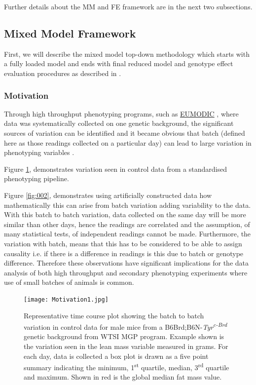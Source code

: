 \documentclass[12pt,a4paper]{article}
\begin{document}
Further details about the MM and FE framework are in the next two subsections.

\subsection{Mixed Model Framework}
First, we will describe the mixed model top-down methodology which starts with a fully loaded model and ends with final reduced model and genotype effect evaluation procedures as described in \cite{MM07}. 

\subsubsection{Motivation}
Through high throughput phenotyping programs, such as \href{http://www.eumodic.org/}{EUMODIC} , where data was systematically collected on one genetic background, the significant sources of variation can be identified and it became obvious that batch (defined here as those readings collected on a particular day) can lead to large variation in phenotyping variables \cite{MM12}.  

Figure \ref{fig:001}, demonstrates variation seen in control data from a standardised phenotyping pipeline. 

Figure \ref{fig:002}, demonstrates using artificially constructed data how mathematically this can arise from batch variation adding variability to the data. With this batch to batch variation, data collected on the same day will be more similar than other days, hence the readings are correlated and the assumption, of many statistical tests, of independent readings cannot be made.  Furthermore, the variation with batch, means that this has to be considered to be able to assign causality i.e. if there is a difference in readings is this due to batch or genotype difference.  Therefore these observations have significant implications for the data analysis of both high throughput and secondary phenotyping experiments where use of small batches of animals is common. 

\begin{figure}[!htpb]%
\centerline{\texttt{[image: Motivation1.jpg]}}
\caption{Representative time course plot showing the batch to batch variation in control data for male mice from a B6Brd;B6N-\textit{Tyr\textsuperscript{c-Brd}} genetic background from WTSI MGP program. Example shown is the variation seen in the lean mass variable measured in grams.   For each day, data is collected a box plot is drawn as a five point summary indicating the minimum, 1\textsuperscript{st} quartile, median, 3\textsuperscript{rd} quartile and maximum. Shown in red is the global median fat mass value.}\label{fig:001}
\end{figure}
\end{document}
